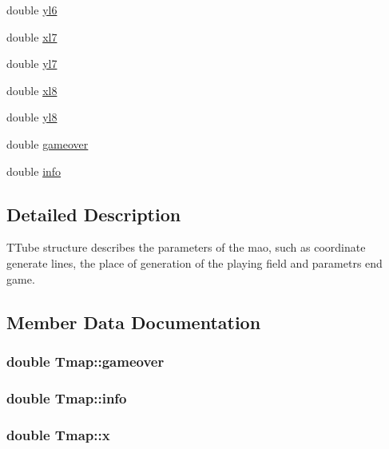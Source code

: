 \begin{DoxyCompactItemize}
\item 
double \hyperlink{struct_tmap_aa86d5aff6f75d2077f5e19b7bef67e08}{yl6}
\item 
double \hyperlink{struct_tmap_aaf9bee3609564a5fa70263f96c3fa5c3}{xl7}
\item 
double \hyperlink{struct_tmap_a096b97170b08fa99f2692695a6775e35}{yl7}
\item 
double \hyperlink{struct_tmap_a6d8cf78e50c3630a4e9a31602a227902}{xl8}
\item 
double \hyperlink{struct_tmap_aedd27b113a1e4f091ccbba9c6d8c3237}{yl8}
\item 
double \hyperlink{struct_tmap_ab08a0a58d40529220e9c122d35e3f395}{gameover}
\item 
double \hyperlink{struct_tmap_a80a5c7085f7bc0ecb2156602f3fd3662}{info}
\end{DoxyCompactItemize}


\subsection{Detailed Description}
T\+Tube structure describes the parameters of the mao, such as coordinate generate lines, the place of generation of the playing field and parametrs end game. 

\subsection{Member Data Documentation}
\subsubsection[{\texorpdfstring{gameover}{gameover}}]{\setlength{\rightskip}{0pt plus 5cm}double Tmap\+::gameover}\hypertarget{struct_tmap_ab08a0a58d40529220e9c122d35e3f395}{}\label{struct_tmap_ab08a0a58d40529220e9c122d35e3f395}
\subsubsection[{\texorpdfstring{info}{info}}]{\setlength{\rightskip}{0pt plus 5cm}double Tmap\+::info}\hypertarget{struct_tmap_a80a5c7085f7bc0ecb2156602f3fd3662}{}\label{struct_tmap_a80a5c7085f7bc0ecb2156602f3fd3662}
\subsubsection[{\texorpdfstring{x}{x}}]{\setlength{\rightskip}{0pt plus 5cm}double Tmap\+::x}\hypertarget{struct_tmap_a20053fbc7a23824b9e4618e239eeaf59}{}\label{struct_tmap_a20053fbc7a23824b9e4618e239eeaf59}
